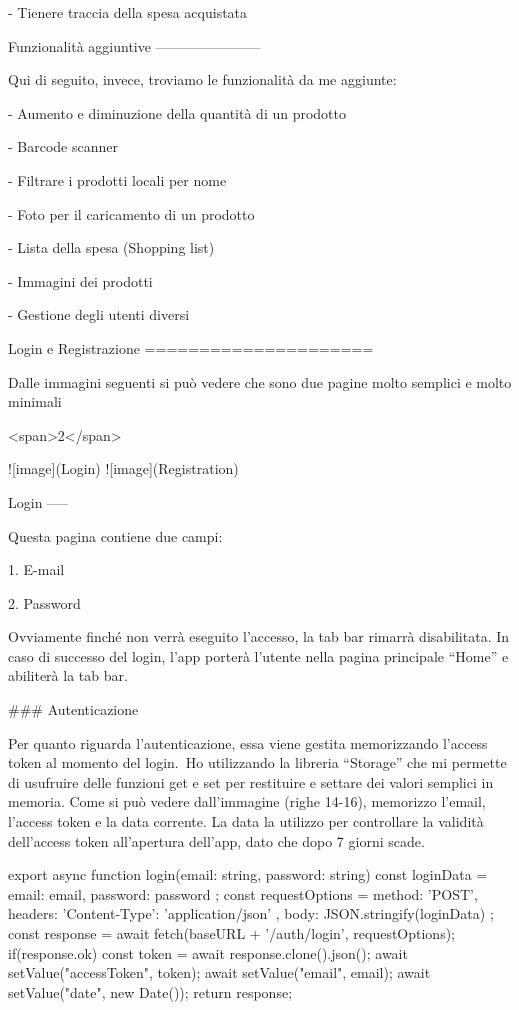 -   Tienere traccia della spesa acquistata

Funzionalità aggiuntive
-----------------------

Qui di seguito, invece, troviamo le funzionalità da me aggiunte:

-   Aumento e diminuzione della quantità di un prodotto

-   Barcode scanner

-   Filtrare i prodotti locali per nome

-   Foto per il caricamento di un prodotto

-   Lista della spesa (Shopping list)

-   Immagini dei prodotti

-   Gestione degli utenti diversi

Login e Registrazione
=====================

Dalle immagini seguenti si può vedere che sono due pagine molto semplici
e molto minimali

<span>2</span>

![image](Login) ![image](Registration)

Login
-----

Questa pagina contiene due campi:

1.  E-mail

2.  Password

Ovviamente finché non verrà eseguito l’accesso, la tab bar rimarrà
disabilitata. In caso di successo del login, l’app porterà l’utente
nella pagina principale “Home” e abiliterà la tab bar.

### Autenticazione

Per quanto riguarda l’autenticazione, essa viene gestita memorizzando
l’access token al momento del login.\
Ho utilizzando la libreria “Storage” che mi permette di usufruire delle
funzioni get e set per restituire e settare dei valori semplici in
memoria. Come si può vedere dall’immagine (righe 14-16), memorizzo
l’email, l’access token e la data corrente. La data la utilizzo per
controllare la validità dell’access token all’apertura dell’app, dato
che dopo 7 giorni scade.

    export async function login(email: string, password: string) {
        const loginData = {
            email: email,
            password: password
        };
        const requestOptions = {
            method: 'POST',
            headers: { 'Content-Type': 'application/json' },
            body: JSON.stringify(loginData)
        };
        const response = await fetch(baseURL + '/auth/login', requestOptions);
        if(response.ok) {
            const token = await response.clone().json();
            await setValue("accessToken", token);
            await setValue("email", email);
            await setValue("date", new Date());
        }
        return response;
    }

